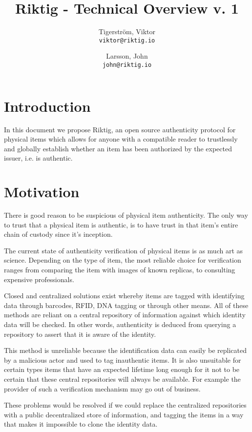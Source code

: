 \documentclass[twocolumn,titlepage]{article}
\title{Riktig - Technical Overview v. 1}
\author{
  Tigerström, Viktor\\
  \texttt{viktor@riktig.io}
  \and
  Larsson, John\\
  \texttt{john@riktig.io}
}
\date{ }
\begin{document}
\maketitle

\section{Introduction}
In this document we propose Riktig, an open source authenticity protocol for physical items which allows for anyone with a compatible reader to trustlessly and globally establish whether an item has been authorized by the expected issuer, i.e. is authentic.

\section{Motivation}
There is good reason to be suspicious of physical item authenticity. The only way to trust that a physical item is authentic, is to have trust in that item's entire chain of custody since it's inception. 

The current state of authenticity verification of physical items is as much art as science. Depending on the type of item, the most reliable choice for verification ranges from comparing the item with images of known replicas, to consulting expensive professionals.

Closed and centralized solutions exist whereby items are tagged with identifying data through barcodes, RFID, DNA tagging or through other means. All of these methods are reliant on a central repository of information against which identity data will be checked. In other words, authenticity is deduced from querying a repository to assert that it is aware of the identity.

This method is unreliable because the identification data can easily be replicated by a malicious actor and used to tag inauthentic items. It is also unsuitable for certain types items that have an expected lifetime long enough for it not to be certain that these central repositories will always be available. For example the provider of such a verification mechanism may go out of business.

These problems would be resolved if we could replace the centralized repositories with a public decentralized store of information, and tagging the items in a way that makes it impossible to clone the identity data.
\end{document}
